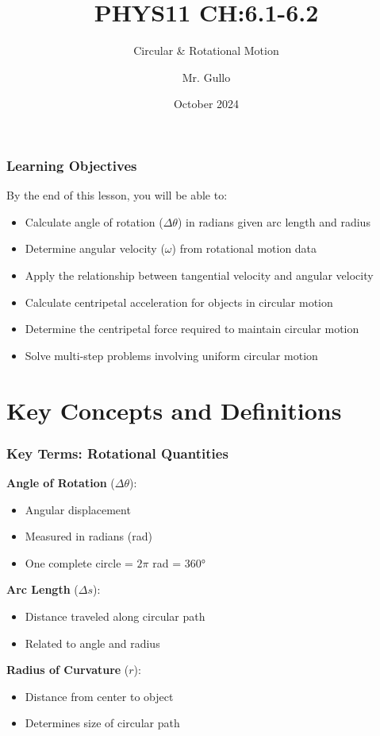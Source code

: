 \documentclass{beamer}
\title[Circular and Rotational Motion]{PHYS11 CH:6.1-6.2}
\subtitle{Circular \& Rotational Motion}
\author[Mr. Gullo]{Mr. Gullo}
\date[Oct 2024]{October 2024}
\begin{document}
\frame{\titlepage}

\begin{frame}
\frametitle{Learning Objectives}
By the end of this lesson, you will be able to:
\pause
\begin{itemize}
    \item Calculate angle of rotation ($\Delta\theta$) in radians given arc length and radius
    \pause
    \item Determine angular velocity ($\omega$) from rotational motion data
    \pause
    \item Apply the relationship between tangential velocity and angular velocity
    \pause
    \item Calculate centripetal acceleration for objects in circular motion
    \pause
    \item Determine the centripetal force required to maintain circular motion
    \pause
    \item Solve multi-step problems involving uniform circular motion
\end{itemize}
\end{frame}

\section{Key Concepts and Definitions}

\begin{frame}
\frametitle{Key Terms: Rotational Quantities}
\pause
\textbf{Angle of Rotation} ($\Delta \theta$):
\begin{itemize}
    \item Angular displacement
    \item Measured in radians (rad)
    \item One complete circle = $2\pi$ rad = 360°
\end{itemize}
\pause

\textbf{Arc Length} ($\Delta s$):
\begin{itemize}
    \item Distance traveled along circular path
    \item Related to angle and radius
\end{itemize}
\pause

\textbf{Radius of Curvature} ($r$):
\begin{itemize}
    \item Distance from center to object
    \item Determines size of circular path
\end{itemize}
\end{frame}
\end{document}
